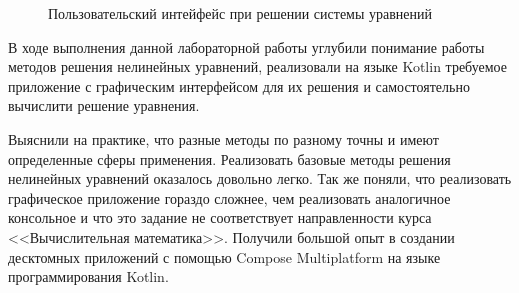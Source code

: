 \begin{figure}
    \centering
    \caption{Пользовательский интейфейс при решении системы уравнений}
    \label{fig:screenshot-system}
\end{figure}

В ходе выполнения данной лабораторной работы углубили понимание работы методов решения нелинейных уравнений, реализовали на языке Kotlin требуемое приложение с графическим интерфейсом для их решения и самостоятельно вычислити решение уравнения.

Выяснили на практике, что разные методы по разному точны и имеют определенные сферы применения. Реализовать базовые методы решения нелинейных уравнений оказалось довольно легко. Так же поняли, что реализовать графическое приложение гораздо сложнее, чем реализовать аналогичное консольное и что это задание не соответствует направленности курса <<Вычислительная математика>>. Получили большой опыт в создании десктомных приложений с помощью Compose Multiplatform на языке программирования Kotlin.

\newpage



